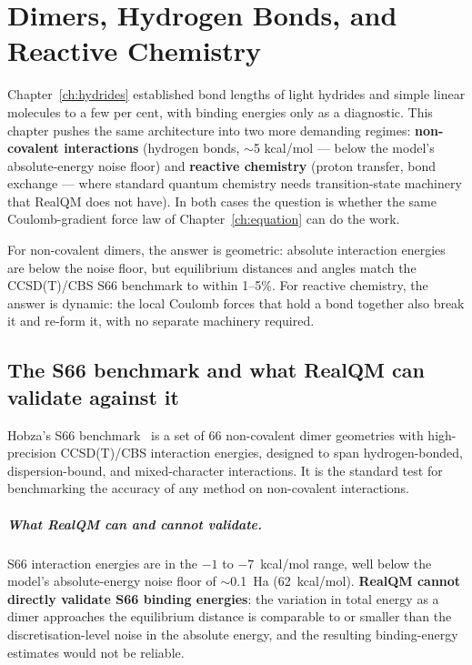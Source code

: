 \chapter{Dimers, Hydrogen Bonds, and Reactive Chemistry}\label{ch:dimers}

Chapter~\ref{ch:hydrides} established bond lengths of light hydrides and simple linear molecules to a few per cent, with binding energies only as a diagnostic. This chapter pushes the same architecture into two more demanding regimes: \textbf{non-covalent interactions} (hydrogen bonds, $\sim$5 kcal/mol --- below the model's absolute-energy noise floor) and \textbf{reactive chemistry} (proton transfer, bond exchange --- where standard quantum chemistry needs transition-state machinery that RealQM does not have). In both cases the question is whether the same Coulomb-gradient force law of Chapter~\ref{ch:equation} can do the work.

For non-covalent dimers, the answer is geometric: absolute interaction energies are below the noise floor, but equilibrium distances and angles match the CCSD(T)/CBS S66 benchmark to within 1--5\%. For reactive chemistry, the answer is dynamic: the local Coulomb forces that hold a bond together also break it and re-form it, with no separate machinery required.

\section{The S66 benchmark and what RealQM can validate against it}\label{sec:s66-setup}

Hobza's S66 benchmark~\cite{S66ref} is a set of 66 non-covalent dimer geometries with high-precision CCSD(T)/CBS interaction energies, designed to span hydrogen-bonded, dispersion-bound, and mixed-character interactions. It is the standard test for benchmarking the accuracy of any method on non-covalent interactions.

\paragraph{What RealQM can and cannot validate.}
S66 interaction energies are in the $-1$ to $-7$~kcal/mol range, well below the model's absolute-energy noise floor of $\sim$0.1~Ha (62~kcal/mol). \textbf{RealQM cannot directly validate S66 binding energies}: the variation in total energy as a dimer approaches the equilibrium distance is comparable to or smaller than the discretisation-level noise in the absolute energy, and the resulting binding-energy estimates would not be reliable.

